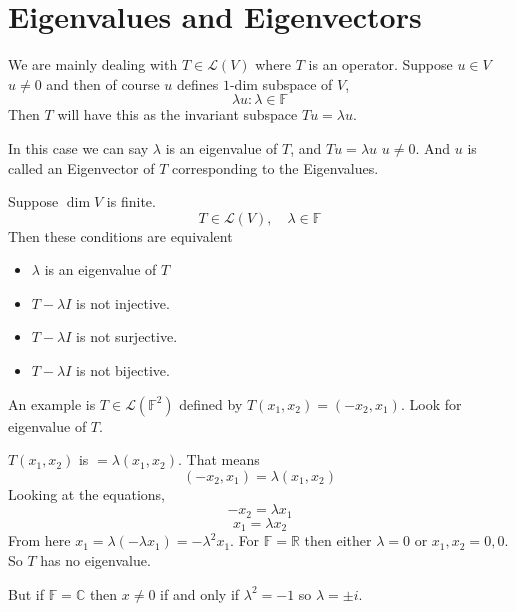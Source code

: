 \documentclass[letter]{article}
\title{}
\author{Ahmed Saad Sabit, Rice University}
\date{\today}
\begin{document}
\maketitle
\section*{Eigenvalues and Eigenvectors}

We are mainly dealing with $T \in \mathcal L(V)$ where $T$ is an operator. 
Suppose $u \in V$ $u\neq 0$ and then of course $u$ defines $1$-dim subspace of $V$, 
\[
\lambda u : \lambda \in \mathbb{F}
\]
Then $T$ will have this as the invariant subspace $Tu = \lambda u$. 

In this case we can say $\lambda $ is an eigenvalue of $T$, and $T u = \lambda u$ $u\neq 0$. And $u$ is called an Eigenvector of $T$ corresponding to the Eigenvalues. 

Suppose $\dim V$ is finite. 
\[
T \in \mathcal L (V), \quad \lambda \in \mathbb{F}
\] 
Then these conditions are equivalent
\begin{itemize}
	\item $\lambda$ is an eigenvalue of $T$ 
	\item $T - \lambda I$ is not injective. 
	\item $T - \lambda I$ is not surjective. 
	\item $T - \lambda I$ is not bijective. 
\end{itemize}

An example is $T \in \mathcal L(\mathbb{F}^2)$ defined by $T(x_1,x_2) =  (-x_2, x_1)$. Look for eigenvalue of $T$. 

$T(x_1,x_2)$  is $= \lambda (x_1, x_2)$. That means 
\[
	(-x_2, x_1) = \lambda (x_1 ,x_2)
\] 
Looking at the equations, 
\[
-x_2 = \lambda x_1
\] 
\[
x_1 = \lambda x_2
\] 
From here $x_1 = \lambda (- \lambda x_1) = - \lambda^2 x_1$. For $\mathbb{F}= \mathbb{R}$ then either $\lambda = 0$ or $x_1 , x_2 = 0,0$. So $T$ has no eigenvalue. 

But if $\mathbb{F}= \mathbb{C}$ then $x\neq 0$ if and only if $\lambda^2 = - 1$ so $\lambda = \pm i$. 
\end{document}
